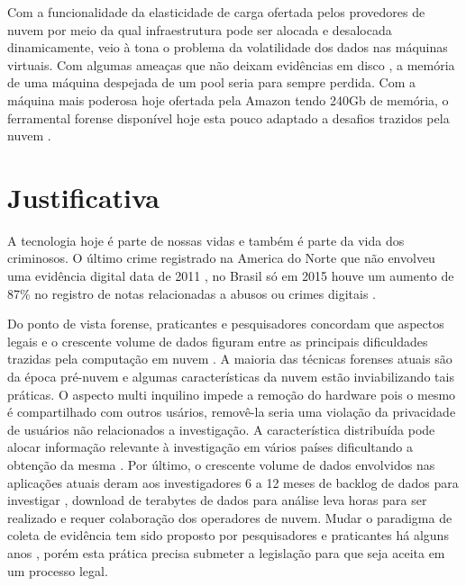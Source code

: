 \documentclass[
	12pt,				%
	openright,			%
	oneside,			%
	a4paper,			%
	english,			%
	french,				%
	spanish,			%
	brazil,				%
	]{abntex2}
\begin{document}
\par

Com a funcionalidade da elasticidade de carga ofertada pelos provedores de nuvem por meio da qual infraestrutura pode ser alocada e desalocada dinamicamente, veio à tona o problema
da volatilidade dos dados nas máquinas virtuais. Com algumas ameaças que não deixam evidências em disco \cite{Aljaedi2011}, a memória de uma máquina despejada de um pool seria para sempre
perdida. Com a máquina mais poderosa hoje ofertada pela Amazon tendo 240Gb de memória, o ferramental forense disponível hoje esta pouco adaptado a desafios trazidos 
pela nuvem \cite{Dykstra2012a}.

\chapter{Justificativa}

A tecnologia hoje é parte de nossas vidas e também é parte da vida dos criminosos. O último crime registrado na America do Norte que não envolveu uma evidência digital data de 2011 \cite{Quick2014}
, no Brasil só em 2015 houve um aumento de 87\% no registro de notas relacionadas a abusos ou crimes digitais \cite{cnbsp}.

\par

Do ponto de vista forense, praticantes e pesquisadores concordam que aspectos legais e o crescente volume de dados figuram entre as principais dificuldades trazidas pela computação 
em nuvem \cite{Bash2015a}. A maioria das técnicas forenses atuais são da época pré-nuvem e algumas características da nuvem estão inviabilizando tais práticas. O aspecto multi inquilino 
impede a remoção do hardware pois o mesmo é compartilhado com outros usários, removê-la seria uma violação da privacidade de usuários não relacionados a investigação. A característica
 distribuída pode alocar informação relevante à investigação em vários países dificultando a obtenção da mesma \cite{Dykstra2012a}. Por último, o crescente volume de dados envolvidos nas 
 aplicações atuais deram aos investigadores 6 a 12 meses de backlog de dados para investigar \cite{Quick2014}, download de terabytes de dados para análise leva horas para ser realizado e 
 requer colaboração dos operadores de nuvem. Mudar o paradigma de coleta de evidência tem sido proposto por pesquisadores e praticantes há alguns anos \cite{Birk2011}\cite{Sang2013} , porém esta prática precisa 
 submeter a legislação para que seja aceita em um processo legal.
\end{document}
